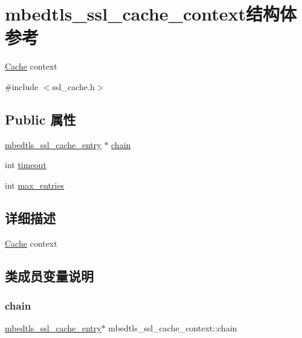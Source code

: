\hypertarget{structmbedtls__ssl__cache__context}{}\section{mbedtls\+\_\+ssl\+\_\+cache\+\_\+context结构体 参考}
\label{structmbedtls__ssl__cache__context}


\hyperlink{struct_cache}{Cache} context  




{\ttfamily \#include $<$ssl\+\_\+cache.\+h$>$}

\subsection*{Public 属性}
\begin{DoxyCompactItemize}
\item 
\hyperlink{structmbedtls__ssl__cache__entry}{mbedtls\+\_\+ssl\+\_\+cache\+\_\+entry} $\ast$ \hyperlink{structmbedtls__ssl__cache__context_a2039e68fc448803446e536e379638acb}{chain}
\item 
int \hyperlink{structmbedtls__ssl__cache__context_af5d2f556c477eb510117b4a34c02dba4}{timeout}
\item 
int \hyperlink{structmbedtls__ssl__cache__context_a5a490fa803aa85541cab7808db43c477}{max\+\_\+entries}
\end{DoxyCompactItemize}


\subsection{详细描述}
\hyperlink{struct_cache}{Cache} context 

\subsection{类成员变量说明}
\mbox{\label{structmbedtls__ssl__cache__context_a2039e68fc448803446e536e379638acb}} 
\subsubsection{\texorpdfstring{chain}{chain}}
{\footnotesize\ttfamily \hyperlink{structmbedtls__ssl__cache__entry}{mbedtls\+\_\+ssl\+\_\+cache\+\_\+entry}$\ast$ mbedtls\+\_\+ssl\+\_\+cache\+\_\+context\+::chain}

